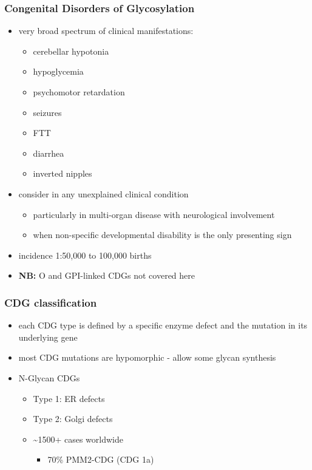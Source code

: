 \documentclass[12pt]{scrartcl}
\begin{document}
\subsubsection{Congenital Disorders of Glycosylation}
\label{sec:orgbef6495}
\begin{itemize}
\item very broad spectrum of clinical manifestations:
\begin{itemize}
\item cerebellar hypotonia
\item hypoglycemia
\item psychomotor retardation
\item seizures
\item FTT
\item diarrhea
\item inverted nipples
\end{itemize}
\item consider in any unexplained clinical condition
\begin{itemize}
\item particularly in multi-organ disease with neurological involvement
\item when non-specific developmental disability is the only presenting sign
\end{itemize}
\item incidence 1:50,000 to 100,000 births
\item \textbf{NB:} O and GPI-linked CDGs not covered here
\end{itemize}
\subsubsection{CDG classification}
\label{sec:org7588483}
\begin{itemize}
\item each CDG type is defined by a specific enzyme defect and the mutation in its underlying gene
\item most CDG mutations are hypomorphic - allow some glycan synthesis
\item N-Glycan CDGs
\begin{itemize}
\item Type 1: ER defects
\item Type 2: Golgi defects
\item \textasciitilde{}1500+ cases worldwide
\begin{itemize}
\item 70\% PMM2-CDG (CDG 1a)
\end{itemize}
\end{itemize}
\end{itemize}
\end{document}
